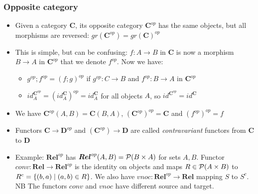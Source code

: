 \documentclass[handout]{beamer}
\newcommand{\bfsf}[1]{{\boldsymbol{#1}}}
\newcommand{\CC}{\bfsf{C}}
\newcommand{\DD}{\bfsf{D}}
\newcommand{\Rel}{\bfsf{Rel}}
\begin{document}
\frame
  {   
    \frametitle{Opposite category}\label{Ch2:OppCat}

 \begin{itemize}[<+->]
\item Given a category $\CC$, its opposite category $\CC^{op}$ has the same
objects, but all morphisms are reversed: $gr(\CC^{op}) = gr(\CC)^{op}$
\item This is simple, but can be confusing: $f: A\to B$ in $\CC$ is now a
morphism $B\to A$ in $\CC^{op}$ that we denote $f^{op}$. Now we have:
   \begin{itemize}[<+->]
\item$g^{op}; f^{op} = (f;g)^{op}$ if $g^{op}:C\to B$ and $f^{op}: B\to A$ in $\CC^{op}$
\item $id^{\CC^{op}}_A = (id^\CC_A)^{op} = id^\CC_A$ for all objects $A$,
so $id^{\CC^{op}} = id^\CC$
   \end{itemize}
\item We have $\CC^{op}(A,B)=\CC(B,A)$, $(\CC^{op})^{op}= \CC$ and $(f^{op})^{op}= f$
\item Functors $\CC\to\DD^{op}$ and $(\CC^{op})\to \DD$ are called
\emph{contravariant} functors from $\CC$ to $\DD$
\item Example: $\Rel^{op}$ has $\Rel^{op}(A,B)=\powset(B\times A)$
for sets $A,B$. Functor $conv: \Rel\to\Rel^{op}$ is the identity on objects 
and maps $R\in\operatorname{\mathcal{P}}(A\times B)$ to $R^c = \{(b,a)\mid (a,b)\in R\}$.
We also have $vnoc: \Rel^{op}\to\Rel$ mapping $S$ to $S^c$. NB The functors
$conv$ and $vnoc$ have different source and target.
 \end{itemize}

 }
\end{document}
